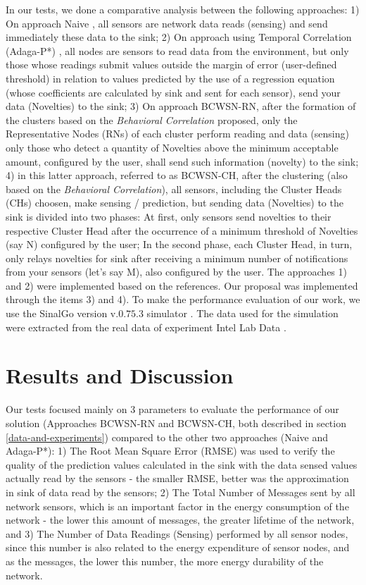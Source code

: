 \documentclass[conference]{IEEEtran}
\begin{document}
In our tests, we done a comparative analysis between the following approaches:
1) On approach Naive \cite{Madden2005}, all sensors are network data reads
(sensing) and send immediately these data to the sink; 2) On approach using
Temporal Correlation (Adaga-P*) \cite{MaiaSAC2013}, all nodes are sensors to
read data from the environment, but only those whose readings submit values
outside the margin of error (user-defined threshold) in relation to values
predicted by the use of a regression equation (whose coefficients are calculated
by sink and sent for each sensor), send your data (Novelties) to the sink; 3) On
approach BCWSN-RN, after the formation of the clusters based on the
\textit{Behavioral Correlation} proposed, only the Representative Nodes (RNs) of
each cluster perform reading and data (sensing) only those who detect a quantity
of Novelties above the minimum acceptable amount, configured by the user, shall
send such information (novelty) to the sink; 4) in this latter approach,
referred to as BCWSN-CH, after the clustering (also based on the
\textit{Behavioral Correlation}), all sensors, including the Cluster Heads (CHs)
choosen, make sensing / prediction, but sending data (Novelties) to the sink is
divided into two phases: At first, only sensors send novelties to their
respective Cluster Head after the occurrence of a minimum threshold of Novelties
(say N) configured by the user; In the second phase, each Cluster Head, in turn,
only relays novelties for sink after receiving a minimum number of notifications
from your sensors (let's say M), also configured by the user.
The approaches 1) and 2) were implemented based on the references. Our proposal
was implemented through the items 3) and 4).
To make the performance evaluation of our work, we use the SinalGo version
v.$0.75.3$ simulator \cite{Sinalgo2007}. The data used for the simulation were
extracted from the real data of experiment Intel Lab Data \cite{Intel2004}.

\section{Results and Discussion}
\label{results-and-discussion}

Our tests focused mainly on 3 parameters to evaluate the performance of our
solution (Approaches BCWSN-RN and BCWSN-CH, both described in section
\ref{data-and-experiments}) compared to the other two approaches (Naive and
Adaga-P*): 1) The Root Mean Square Error (RMSE) was used to verify the quality
of the prediction values calculated in the sink with the data sensed values
actually read by the sensors - the smaller RMSE, better was the approximation in
sink of data read by the sensors; 2) The Total Number of Messages sent by all
network sensors, which is an important factor in the energy consumption of the network -
the lower this amount of messages, the greater lifetime of the network, and 3)
The Number of Data Readings (Sensing) performed by all sensor nodes, since this
number is also related to the energy expenditure of sensor nodes, and as the
messages, the lower this number, the more energy durability of the network.
\end{document}
